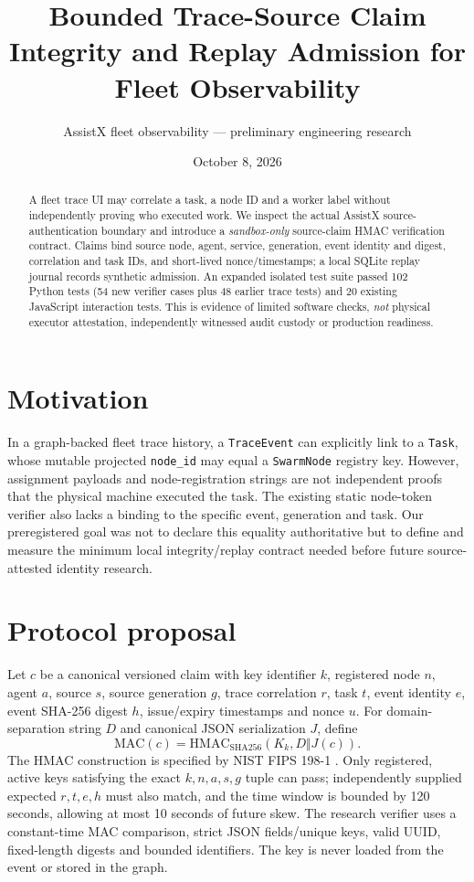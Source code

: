 \documentclass[11pt]{article}
\title{Bounded Trace-Source Claim Integrity and Replay Admission for Fleet Observability}
\author{AssistX fleet observability --- preliminary engineering research}
\date{October 8, 2026}
\begin{document}
\maketitle
\begin{abstract}
A fleet trace UI may correlate a task, a node ID and a worker label without independently proving who executed work. We inspect the actual AssistX source-authentication boundary and introduce a \emph{sandbox-only} source-claim HMAC verification contract. Claims bind source node, agent, service, generation, event identity and digest, correlation and task IDs, and short-lived nonce/timestamps; a local SQLite replay journal records synthetic admission. An expanded isolated test suite passed 102 Python tests (54 new verifier cases plus 48 earlier trace tests) and 20 existing JavaScript interaction tests. This is evidence of limited software checks, \emph{not} physical executor attestation, independently witnessed audit custody or production readiness.
\end{abstract}
\section{Motivation}
In a graph-backed fleet trace history, a \texttt{TraceEvent} can explicitly link to a \texttt{Task}, whose mutable projected \texttt{node\_id} may equal a \texttt{SwarmNode} registry key. However, assignment payloads and node-registration strings are not independent proofs that the physical machine executed the task. The existing static node-token verifier also lacks a binding to the specific event, generation and task. Our preregistered goal was not to declare this equality authoritative but to define and measure the minimum local integrity/replay contract needed before future source-attested identity research.
\section{Protocol proposal}
Let $c$ be a canonical versioned claim with key identifier $k$, registered node $n$, agent $a$, source $s$, source generation $g$, trace correlation $r$, task $t$, event identity $e$, event SHA-256 digest $h$, issue/expiry timestamps and nonce $u$. For domain-separation string $D$ and canonical JSON serialization $J$, define
\[
\mathrm{MAC}(c)=\mathrm{HMAC}_{\mathrm{SHA256}}(K_k, D\Vert J(c)).
\]
The HMAC construction is specified by NIST FIPS 198-1 \cite{fips198}. Only registered, active keys satisfying the exact $k,n,a,s,g$ tuple can pass; independently supplied expected $r,t,e,h$ must also match, and the time window is bounded by 120 seconds, allowing at most 10 seconds of future skew. The research verifier uses a constant-time MAC comparison, strict JSON fields/unique keys, valid UUID, fixed-length digests and bounded identifiers. The key is never loaded from the event or stored in the graph.
\end{document}
